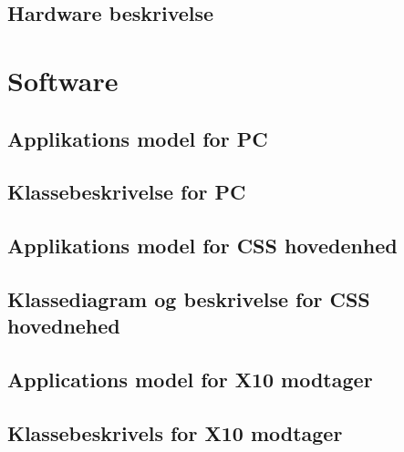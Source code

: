 \subsection{Hardware beskrivelse}


\newpage
\section{Software}

\subsection{Applikations model for PC}

\clearpage

\subsection{Klassebeskrivelse for PC}

\newpage

\subsection{Applikations model for CSS hovedenhed}

\clearpage

\subsection{Klassediagram og beskrivelse for CSS hovednehed}

\newpage

\newpage
\subsection{Applications model for X10 modtager}

\clearpage

\subsection{Klassebeskrivels for X10 modtager}

\newpage